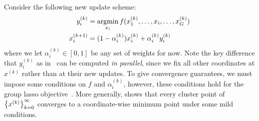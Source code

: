 Consider the following new update scheme:
\begin{align}
    y_i^{(k)} &= \operatorname*{argmin}\limits_{x_i} f(x^{(k)}_1,\ldots, x_i, \ldots, x^{(k)}_G) 
    \label{eq:parallel-bcd:parallel-update}
    \\
    x_i^{(k+1)} &= (1-\alpha_i^{(k)}) x^{(k)}_i + \alpha_i^{(k)} y^{(k)}_i
    \label{eq:parallel-bcd:combine-update}
\end{align}
where we let $\alpha_i^{(k)} \in [0,1]$ be any set of weights for now.
Note the key difference that
$y_i^{(k)}$ as in~
can be computed \emph{in parallel},
since we fix all other coordinates at $x^{(k)}$ rather than at their new updates.
To give convergence guarantees, we must impose some conditions on $f$
and $\alpha_i^{(k)}$, however, these conditions hold for the group lasso objective~.
More generally,  shows that
every cluster point of $\left\{x^{(k)}\right\}_{k=0}^\infty$
converges to a coordinate-wise minimum point under some mild conditions.

